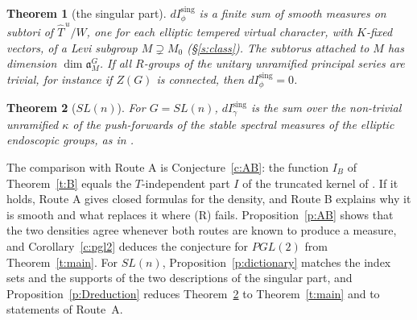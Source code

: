 \documentclass[12pt,letterpaper]{article}
\numberwithin{equation}{section}
\theoremstyle{plain}
\newtheorem{introtheorem}{Theorem}
\theoremstyle{definition}
\theoremstyle{remark}
\newcommand{\fa}{\mathfrak{a}}
\newcommand{\Thu}{\widehat{T}^{\,u}}
\begin{document}
\begin{introtheorem}[the singular part]\label{t:C}
$dI^{\mathrm{sing}}_\phi$ is a finite sum of smooth measures on subtori of $\Thu/W$, one for each elliptic tempered virtual character, with $K$-fixed vectors, of a Levi subgroup $M\supsetneq M_0$ (\S\ref{s:class}). The subtorus attached to $M$ has dimension $\dim\fa_M^G$. If all $R$-groups of the unitary unramified principal series are trivial, for instance if $Z(G)$ is connected, then $dI^{\mathrm{sing}}_\phi=0$.
\end{introtheorem}

\begin{introtheorem}[$SL(n)$]\label{t:D}
For $G=SL(n)$, $dI^{\mathrm{sing}}_\gamma$ is the sum over the non-trivial unramified $\kappa$ of the push-forwards of the stable spectral measures of the elliptic endoscopic groups, as in \cite[Conj.~4.6(c)]{JC26}.
\end{introtheorem}

The comparison with Route A is Conjecture~\ref{c:AB}: the function $I_B$ of Theorem~\ref{t:B} equals the $T$-independent part $I$ of the truncated kernel of \cite{JC26}. If it holds, Route A gives closed formulas for the density, and Route B explains why it is smooth and what replaces it where (R) fails. Proposition~\ref{p:AB} shows that the two densities agree whenever both routes are known to produce a measure, and Corollary~\ref{c:pgl2} deduces the conjecture for $PGL(2)$ from Theorem~\ref{t:main}. For $SL(n)$, Proposition~\ref{p:dictionary} matches the index sets and the supports of the two descriptions of the singular part, and Proposition~\ref{p:Dreduction} reduces Theorem~\ref{t:D} to Theorem~\ref{t:main} and to statements of Route~A.
\end{document}
